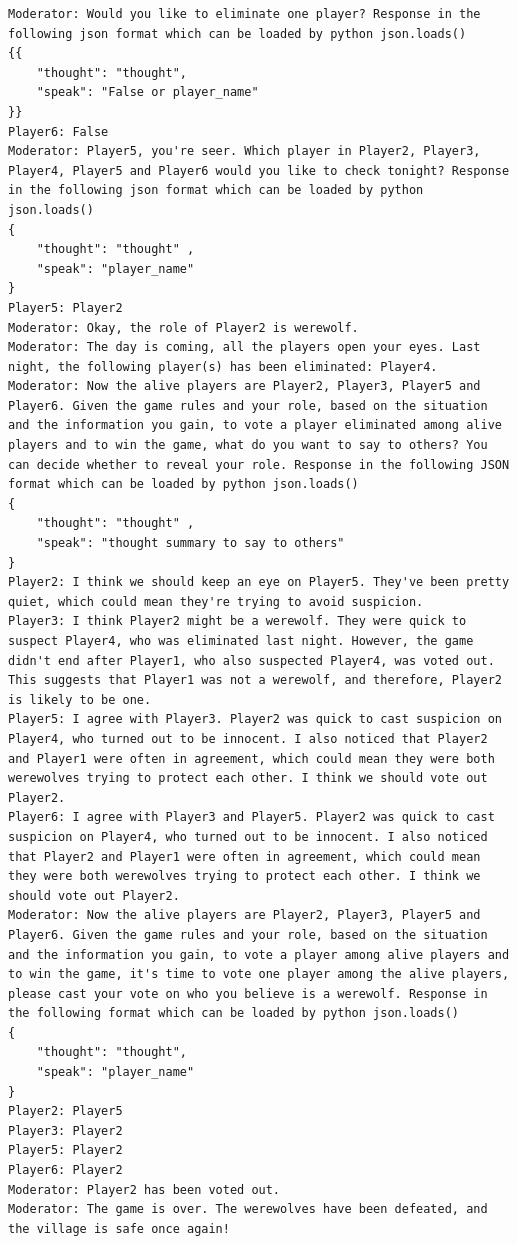 \begin{lstlisting}[language=Werewolf, caption={Running example of werewolf.}, label={lst:wolf_history}]
Moderator: Would you like to eliminate one player? Response in the following json format which can be loaded by python json.loads()
{{
    "thought": "thought", 
    "speak": "False or player_name"
}}
Player6: False
Moderator: Player5, you're seer. Which player in Player2, Player3, Player4, Player5 and Player6 would you like to check tonight? Response in the following json format which can be loaded by python json.loads()
{
    "thought": "thought" ,
    "speak": "player_name"
}
Player5: Player2
Moderator: Okay, the role of Player2 is werewolf.
Moderator: The day is coming, all the players open your eyes. Last night, the following player(s) has been eliminated: Player4.
Moderator: Now the alive players are Player2, Player3, Player5 and Player6. Given the game rules and your role, based on the situation and the information you gain, to vote a player eliminated among alive players and to win the game, what do you want to say to others? You can decide whether to reveal your role. Response in the following JSON format which can be loaded by python json.loads()
{
    "thought": "thought" ,
    "speak": "thought summary to say to others"
}
Player2: I think we should keep an eye on Player5. They've been pretty quiet, which could mean they're trying to avoid suspicion.
Player3: I think Player2 might be a werewolf. They were quick to suspect Player4, who was eliminated last night. However, the game didn't end after Player1, who also suspected Player4, was voted out. This suggests that Player1 was not a werewolf, and therefore, Player2 is likely to be one.
Player5: I agree with Player3. Player2 was quick to cast suspicion on Player4, who turned out to be innocent. I also noticed that Player2 and Player1 were often in agreement, which could mean they were both werewolves trying to protect each other. I think we should vote out Player2.
Player6: I agree with Player3 and Player5. Player2 was quick to cast suspicion on Player4, who turned out to be innocent. I also noticed that Player2 and Player1 were often in agreement, which could mean they were both werewolves trying to protect each other. I think we should vote out Player2.
Moderator: Now the alive players are Player2, Player3, Player5 and Player6. Given the game rules and your role, based on the situation and the information you gain, to vote a player among alive players and to win the game, it's time to vote one player among the alive players, please cast your vote on who you believe is a werewolf. Response in the following format which can be loaded by python json.loads()
{
    "thought": "thought",
    "speak": "player_name"
}
Player2: Player5
Player3: Player2
Player5: Player2
Player6: Player2
Moderator: Player2 has been voted out.
Moderator: The game is over. The werewolves have been defeated, and the village is safe once again!
\end{lstlisting}
